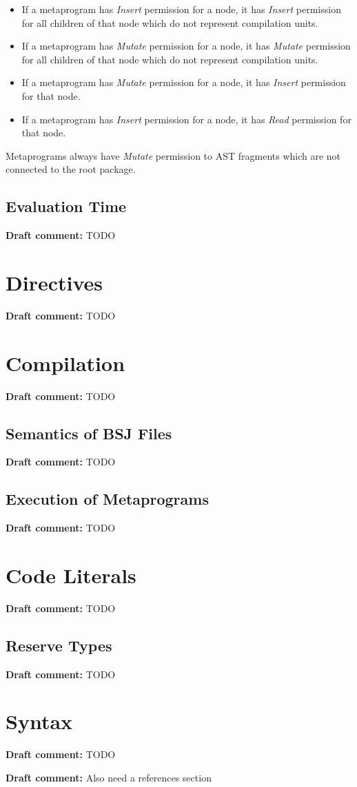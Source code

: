 \documentclass[a4paper,10pt]{report}
\newenvironment{draftcomment}{\vspace{0.5cm}\begin{itshape}\textbf{Draft comment: }}{\end{itshape}\vspace{0.5cm}}
\newcommand{\dc}[1]{\begin{draftcomment}#1\end{draftcomment}} %
\begin{document}
\begin{itemize}
    \item If a metaprogram has \textit{Insert} permission for a node, it has \textit{Insert} permission for all children of that node which do not represent compilation units.
    \item If a metaprogram has \textit{Mutate} permission for a node, it has \textit{Mutate} permission for all children of that node which do not represent compilation units.
    \item If a metaprogram has \textit{Mutate} permission for a node, it has \textit{Insert} permission for that node.
    \item If a metaprogram has \textit{Insert} permission for a node, it has \textit{Read} permission for that node.
\end{itemize}

Metaprograms always have \textit{Mutate} permission to AST fragments which are not connected to the root package.

\section{Evaluation Time}
\label{secMetaprogEvaltime}

\dc{TODO}

\chapter{Directives}
\label{secDirectives}

\dc{TODO}

\chapter{Compilation}
\label{secComp}

\dc{TODO}

\section{Semantics of BSJ Files}
\label{secCompSem}

\dc{TODO}

\section{Execution of Metaprograms}
\label{secCompExec}

\dc{TODO}

\chapter{Code Literals}
\label{secCodelit}

\dc{TODO}

\section{Reserve Types}
\label{secCodelitReserve}

\dc{TODO}

\chapter{Syntax}
\label{secSyntax}

\dc{TODO}

\dc{Also need a references section}
\end{document}
